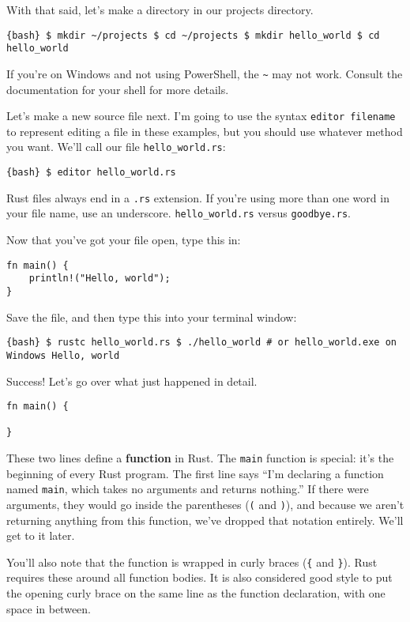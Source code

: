 \documentclass[]{article}
\begin{document}
With that said, let's make a directory in our projects directory.

\texttt{\{bash\} \$ mkdir \textasciitilde{}/projects \$ cd \textasciitilde{}/projects \$ mkdir hello\_world \$ cd hello\_world}

If you're on Windows and not using PowerShell, the
\texttt{\textasciitilde{}} may not work. Consult the documentation for
your shell for more details.

Let's make a new source file next. I'm going to use the syntax
\texttt{editor filename} to represent editing a file in these examples,
but you should use whatever method you want. We'll call our file
\texttt{hello\_world.rs}:

\texttt{\{bash\} \$ editor hello\_world.rs}

Rust files always end in a \texttt{.rs} extension. If you're using more
than one word in your file name, use an underscore.
\texttt{hello\_world.rs} versus \texttt{goodbye.rs}.

Now that you've got your file open, type this in:

\begin{verbatim}
fn main() {
    println!("Hello, world");
}
\end{verbatim}

Save the file, and then type this into your terminal window:

\texttt{\{bash\} \$ rustc hello\_world.rs \$ ./hello\_world \# or hello\_world.exe on Windows Hello, world}

Success! Let's go over what just happened in detail.

\begin{verbatim}
fn main() {
   
}
\end{verbatim}

These two lines define a \textbf{function} in Rust. The \texttt{main}
function is special: it's the beginning of every Rust program. The first
line says ``I'm declaring a function named \texttt{main}, which takes no
arguments and returns nothing.'' If there were arguments, they would go
inside the parentheses (\texttt{(} and \texttt{)}), and because we
aren't returning anything from this function, we've dropped that
notation entirely. We'll get to it later.

You'll also note that the function is wrapped in curly braces
(\texttt{\{} and \texttt{\}}). Rust requires these around all function
bodies. It is also considered good style to put the opening curly brace
on the same line as the function declaration, with one space in between.
\end{document}
